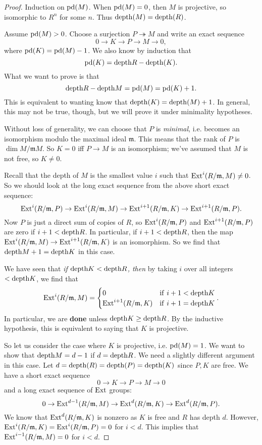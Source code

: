 \begin{proof} 
Induction on $\mathrm{pd}(M)$. When $\mathrm{pd}(M)=0$, then $M$ is projective, so isomorphic
to $R^n$ for some $n$. Thus $\mathrm{depth}(M) = \mathrm{depth}(R)$. 

Assume $\mathrm{pd}(M) > 0$.
Choose a surjection $P \twoheadrightarrow M$ and write an exact sequence
\[ 0 \to K \to P \to M \to 0,  \]
where $\mathrm{pd}(K) = \mathrm{pd}(M)-1$. We also know by induction that
\[ \mathrm{pd}(K) = \mathrm{depth} R - \mathrm{depth}(K).  \]
What we want to prove is that 
\[ \mathrm{depth} R - \mathrm{depth} M = \mathrm{pd}(M) = \mathrm{pd}(K)+1.  \]
This is equivalent to wanting know that $\mathrm{depth}(K) = \mathrm{depth} (M) +1$.
In general, this may not be true, though, but we will prove it under
minimality hypotheses.

Without loss of generality, we can choose that $P$ is \emph{minimal}, i.e.
becomes an isomorphism modulo the maximal ideal $\mathfrak{m}$. This means
that the rank of $P$ is $\dim M/\mathfrak{m}M$.
So $K = 0$ iff $P \to M$ is an isomorphism; we've assumed that $M$ is not
free, so $K \neq 0$.

Recall that the depth of $M$ is the smallest value $i$ such that
$\mathrm{Ext}^i(R/\mathfrak{m}, M) \neq 0$. So we should look at the long exact
sequence from the above short exact sequence:
\[ \mathrm{Ext}^i(R/\mathfrak{m}, P) \to  \mathrm{Ext}^i(R/\mathfrak{m},M)  \to
\mathrm{Ext}^{i+1}(R/\mathfrak{m}, K)  \to \mathrm{Ext}^{i+1}(R/\mathfrak{m}, P).\]
Now $P$ is just a direct sum of copies of $R$, so $\mathrm{Ext}^i(R/\mathfrak{m}, P)$
and $\mathrm{Ext}^{i+1}(R/\mathfrak{m}, P)$ are zero if $i+1< \mathrm{depth} R$. In
particular, if $i+1< \mathrm{depth} R$, then the map $ \mathrm{Ext}^i(R/\mathfrak{m},M)  \to
\mathrm{Ext}^{i+1}(R/\mathfrak{m}, K) $ is an isomorphism.
So we find that $\mathrm{depth} M + 1 = \mathrm{depth} K$ in this case.

We have seen that \emph{if $\mathrm{depth} K < \mathrm{depth} R$, then } by taking $i$ over
all integers $< \mathrm{depth} K$, we find that
\[ \mathrm{Ext}^{i}(R/\mathfrak{m}, M) = \begin{cases} 
0 & \mathrm{if \ } i+1 < \mathrm{depth} K \\
\mathrm{Ext}^{i+1}(R/\mathfrak{m},K) & \mathrm{if \ } i+1 = \mathrm{depth} K \end{cases}. \]
In particular, we are \textbf{done} unless $\mathrm{depth} K \geq \mathrm{depth} R$. 
By the inductive hypothesis, this is equivalent to saying that $K$ is
projective. 

So let us consider the case where $K$ is projective, i.e. $\mathrm{pd}(M)=1$.
We want to show that $\mathrm{depth} M = d-1$ if $d = \mathrm{depth} R$.
We need a
slightly different argument in this case. Let $d = \mathrm{depth}(R) = \mathrm{depth} (P) =
\mathrm{depth}(K)$ since $P,K$ are free. We have a short exact sequence
\[ 0 \to K \to P \to M \to 0  \]
and a long exact sequence of $\mathrm{Ext}$ groups:
\[  0 \to \mathrm{Ext}^{d-1}(R/\mathfrak{m}, M) \to \mathrm{Ext}^d(R/\mathfrak{m}, K) \to  \mathrm{Ext}^d(R/\mathfrak{m}, P) .\]
We know that $\mathrm{Ext}^d(R/\mathfrak{m}, K)$ is nonzero as $K$ is free and $R$ has
depth $d$. However, $\mathrm{Ext}^i(R/\mathfrak{m}, K) = \mathrm{Ext}^i(R/\mathfrak{m}, P)=0$
for $i<d$.  This implies that $\mathrm{Ext}^{i-1}(R/\mathfrak{m}, M)=0$ for $i<d$. 


\end{proof}
